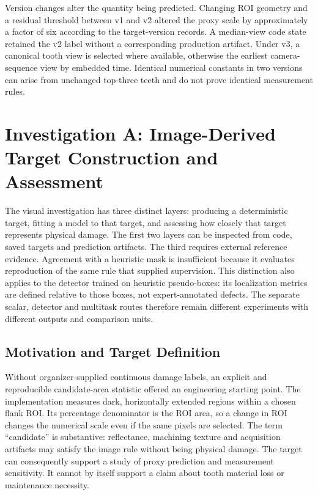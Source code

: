 Version changes alter the quantity being predicted. Changing ROI geometry and a residual
threshold between v1 and v2 altered the proxy scale by approximately a factor of six
according to the target-version records. A median-view code state retained the v2 label
without a corresponding production artifact. Under v3, a canonical tooth view is
selected where available, otherwise the earliest camera-sequence view by embedded time.
Identical numerical constants in two versions can arise from unchanged top-three teeth
and do not prove identical measurement rules.

\section{Investigation A: Image-Derived Target Construction and Assessment}
The visual investigation has three distinct layers: producing a deterministic target,
fitting a model to that target, and assessing how closely that target represents
physical damage. The first two layers can be inspected from code, saved targets and
prediction artifacts. The third requires external reference evidence. Agreement with a
heuristic mask is insufficient because it evaluates reproduction of the same rule that
supplied supervision. This distinction also applies to the detector trained on heuristic
pseudo-boxes: its localization metrics are defined relative to those boxes, not
expert-annotated defects. The separate scalar, detector and multitask routes therefore
remain different experiments with different outputs and comparison units.

\subsection{Motivation and Target Definition}
Without organizer-supplied continuous damage labels, an explicit and reproducible
candidate-area statistic offered an engineering starting point. The implementation
measures dark, horizontally extended regions within a chosen flank ROI. Its percentage
denominator is the ROI area, so a change in ROI changes the numerical scale even if the
same pixels are selected. The term ``candidate'' is substantive: reflectance, machining
texture and acquisition artifacts may satisfy the image rule without being physical
damage. The target can consequently support a study of proxy prediction and measurement
sensitivity. It cannot by itself support a claim about tooth material loss or
maintenance necessity.

